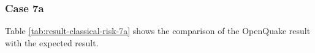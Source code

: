 \subsubsection{Case 7a}




Table \ref{tab:result-classical-risk-7a} shows the comparison of the OpenQuake result with the expected result.

